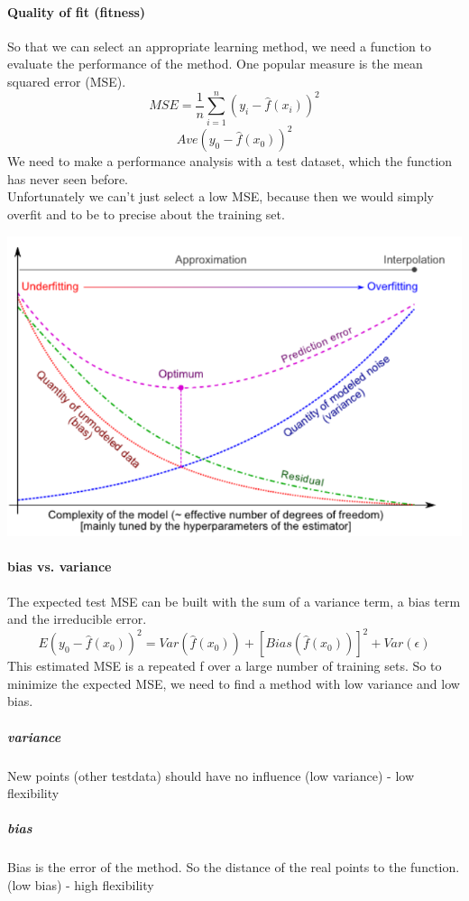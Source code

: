 \documentclass[../document.tex]{subfiles}
\begin{document}
	\paragraph{Quality of fit (fitness)}
	So that we can select an appropriate learning method, we need a function to evaluate the performance of the method. One popular measure is the mean squared error (MSE).
	\begin{equation}
	MSE = \frac{1}{n}\sum_{i=1}^{n} (y_{i}-\hat{f}(x_{i}))^2
	\end{equation}
	\begin{equation}
	Ave(y_{0}-\hat{f}(x_{0}))^2
	\end{equation}
	We need to make a performance analysis with a test dataset, which the function has never seen before.\\
	Unfortunately we can't just select a low MSE, because then we would simply overfit and to be to precise about the training set.\\
	\begin{center}
		\includegraphics[width=.7\textwidth]{pictures/variance_bias_tradeoff.png}
	\end{center}
	
	
	\paragraph{bias vs. variance}
	The expected test MSE can be built with the sum of a variance term, a bias term and the irreducible error.
	\begin{equation}
	E(y_{0}-\hat{f}(x_{0}))^2 = Var(\hat{f}(x_{0})) + [Bias(\hat{f}(x_{0}))]^2 + Var(\epsilon)
	\end{equation}
	This estimated MSE is a repeated f over a large number of training sets. So to minimize the expected MSE, we need to find a method with low variance and low bias.\\
	\subparagraph{variance}
	New points (other testdata) should have no influence (low variance) - low flexibility
	\subparagraph{bias}
	Bias is the error of the method. So the distance of the real points to the function. (low bias) - high flexibility
	
\end{document}
